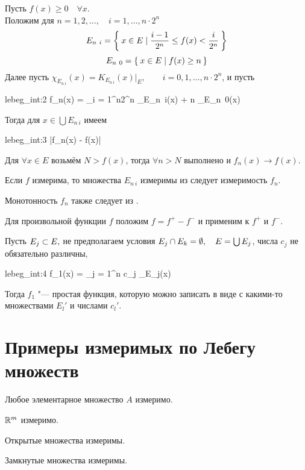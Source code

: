 \begin{eproof}
	\item Пусть $ f(x) \ge 0 \quad \forall x $. \\
		Положим для $ n = 1, 2, \dots, \quad i = 1, \dots, n \cdot 2^n $
		$$ E_{n~i} = \Set{x \in E \mid \frac{i - 1}{2^n} \le f(x) < \frac i{2^n}} $$
		$$ E_{n~0} = \Set{x \in E \mid f(x) \ge n} $$
		Далее пусть $ \chi_{E_{n~i}}(x) = K_{E_{n~i}}(x) \big|_E, \qquad i = 0, 1, \dots, n \cdot 2^n $, и пусть
		\begin{equ}{lebeg_int:2}
			f_n(x) = \sum_{i = 1}^{n2^n}  \chi_{E_{n~i}}(x) + n \chi_{E_{n~0}}(x)
		\end{equ}
		Тогда для $ x \in \bigcup E_{n~i} $ имеем
		\begin{equ}{lebeg_int:3}
			|f_n(x) - f(x)| \le {}
		\end{equ}
		Для $ \forall x \in E $ возьмём $ N > f(x) $, тогда $ \forall n > N $ выполнено  и $ f_n(x) \to f(x) $.

	\item Если $ f $ измерима, то множества $ E_{n~i} $ измеримы из  следует измеримость $ f_n $.

	\item Монотонность $ f_n $ также следует из .

	\item Для произвольной функции $ f $ положим $ f = f^+ - f^- $ и  применим к $ f^+ $ и $ f^- $.
\end{eproof}

\begin{remark}
	Пусть $ E_j \subset E, $ не предполагаем условия $ E_j \cap E_k = \emptyset, \quad E = \bigcup E_j $, числа $ c_j $ не обязательно различны,
	\begin{equ}{lebeg_int:4}
		f_1(x) = \sum_{j = 1}^n c_j \chi_{E_j}(x)
	\end{equ}

	Тогда $ f_1 $ "--- простая функция, которую можно записать в виде  с какими-то множествами $ E_l' $ и числами $ c_l' $.
\end{remark}

\section{Примеры измеримых по Лебегу множеств}

\begin{exmpls}
	\item Любое элементарное множество $ A $ измеримо.
	\item $ \mathbb{R}^m $ измеримо.
	\item Открытые множества измеримы.
	\item Замкнутые множества измеримы.
\end{exmpls}

